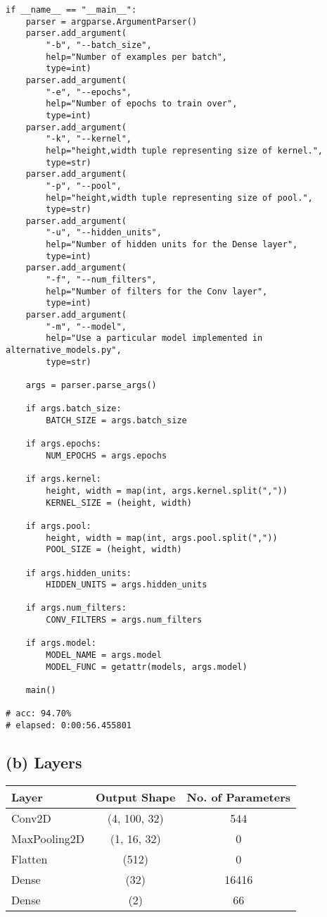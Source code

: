 \documentclass{article}[11pt]
\newcommand\Tstrut{\rule{0pt}{2.4ex}}
\begin{document}
\begin{verbatim}
if __name__ == "__main__":
    parser = argparse.ArgumentParser()
    parser.add_argument(
        "-b", "--batch_size",
        help="Number of examples per batch",
        type=int)
    parser.add_argument(
        "-e", "--epochs",
        help="Number of epochs to train over",
        type=int)
    parser.add_argument(
        "-k", "--kernel",
        help="height,width tuple representing size of kernel.",
        type=str)
    parser.add_argument(
        "-p", "--pool",
        help="height,width tuple representing size of pool.",
        type=str)
    parser.add_argument(
        "-u", "--hidden_units",
        help="Number of hidden units for the Dense layer",
        type=int)
    parser.add_argument(
        "-f", "--num_filters",
        help="Number of filters for the Conv layer",
        type=int)
    parser.add_argument(
        "-m", "--model",
        help="Use a particular model implemented in alternative_models.py",
        type=str)

    args = parser.parse_args()

    if args.batch_size:
        BATCH_SIZE = args.batch_size

    if args.epochs:
        NUM_EPOCHS = args.epochs
    
    if args.kernel:
        height, width = map(int, args.kernel.split(","))
        KERNEL_SIZE = (height, width)

    if args.pool:
        height, width = map(int, args.pool.split(","))
        POOL_SIZE = (height, width)
    
    if args.hidden_units:
        HIDDEN_UNITS = args.hidden_units
    
    if args.num_filters:
        CONV_FILTERS = args.num_filters

    if args.model:
        MODEL_NAME = args.model
        MODEL_FUNC = getattr(models, args.model)

    main()

# acc: 94.70%
# elapsed: 0:00:56.455801
\end{verbatim}

\subsection*{(b) Layers}

\begin{center}
\begin{tabular}{l c c}
\hline
{\bf Layer} & {\bf Output Shape} & {\bf No. of Parameters} \Tstrut\\
\hline
Conv2D & (4, 100, 32) & 544\\
MaxPooling2D & (1, 16, 32) & 0\\
Flatten & (512) & 0\\
Dense & (32) & 16416\\
Dense & (2) & 66\\
\hline
\end{tabular}
\end{center}
\end{document}
